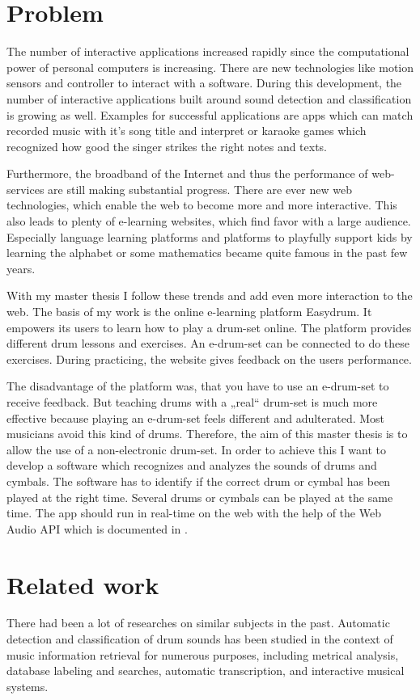 \section{Problem}
The number of interactive applications increased rapidly since the computational power of personal computers is increasing. There are new technologies like motion sensors and controller to interact with a software. During this development, the number of interactive applications built around sound detection and classification is growing as well. Examples for successful applications are apps which can match recorded music with it's song title and interpret or karaoke games which recognized how good the singer strikes the right notes and texts.

Furthermore, the broadband of the Internet and thus the performance of web-services are still making substantial progress. There are ever new web technologies, which enable the web to become more and more interactive. This also leads to plenty of e-learning websites, which find favor with a large audience. Especially language learning platforms and platforms to playfully support kids by learning the alphabet or some mathematics became quite famous in the past few years.

With my master thesis I follow these trends and add even more interaction to the web. The basis of my work is the online e-learning platform Easydrum. It empowers its users to learn how to play a drum-set online. The platform provides different drum lessons and exercises. An e-drum-set can be connected to do these exercises. During practicing, the website gives feedback on the users performance.

The disadvantage of the platform was, that you have to use an e-drum-set to receive feedback. But teaching drums with a „real“ drum-set is much more effective because playing an e-drum-set feels different and adulterated. Most musicians avoid this kind of drums. Therefore, the aim of this master thesis is to allow the use of a non-electronic drum-set. In order to achieve this I want to develop a software which recognizes and analyzes the sounds of drums and cymbals. The software has to identify if the correct drum or cymbal has been played at the right time. Several drums or cymbals can be played at the same time. The app should run in real-time on the web with the help of the Web Audio API which is documented in \autocite{WebAudioApi:2015}.

\section{Related work}
There had been a lot of researches on similar subjects in the past. Automatic detection and classification of drum sounds has been studied in the context of music information retrieval for numerous purposes, including metrical analysis, database labeling and searches, automatic transcription, and interactive musical systems.

